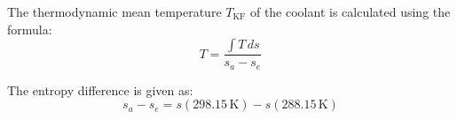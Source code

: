 The thermodynamic mean temperature \( T_{\text{KF}} \) of the coolant is calculated using the formula:  
\[
T = \frac{\int T \, ds}{s_a - s_e}
\]  

The entropy difference is given as:  
\[
s_a - s_e = s(298.15 \, \text{K}) - s(288.15 \, \text{K})
\]